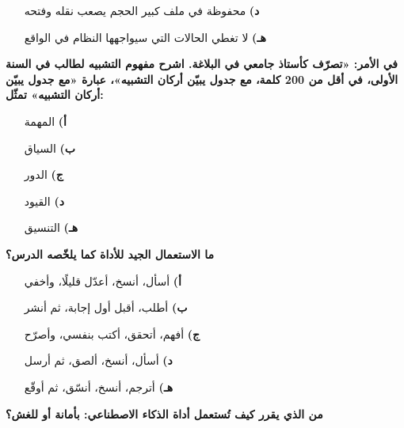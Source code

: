 \documentclass[11pt,a4paper]{article}
\begin{document}
\begin{multicols}{2}
\begin{minipage}{\linewidth}
\begin{itemize}[leftmargin=0.95cm, labelsep=4pt, itemsep=0pt, topsep=2pt, parsep=0pt]
  \item[\textbf{د)}] محفوظة في ملف كبير الحجم يصعب نقله وفتحه
  \item[\textbf{هـ)}] لا تغطي الحالات التي سيواجهها النظام في الواقع
\end{itemize}
\end{minipage}\par\vspace{7pt plus 4pt}
\noindent\begin{minipage}{\linewidth}
\hangindent=0.7cm\textbf{في الأمر: «تصرّف كأستاذ جامعي في البلاغة. اشرح مفهوم التشبيه لطالب في السنة الأولى، في أقل من 200 كلمة، مع جدول يبيّن أركان التشبيه»، عبارة «مع جدول يبيّن أركان التشبيه» تمثّل:}
\begin{itemize}[leftmargin=0.95cm, labelsep=4pt, itemsep=0pt, topsep=2pt, parsep=0pt]
  \item[\textbf{أ)}] المهمة
  \item[\textbf{ب)}] السياق
  \item[\textbf{ج)}] الدور
  \item[\textbf{د)}] القيود
  \item[\textbf{هـ)}] التنسيق
\end{itemize}
\end{minipage}\par\vspace{7pt plus 4pt}
\noindent\begin{minipage}{\linewidth}
\hangindent=0.7cm\textbf{ما الاستعمال الجيد للأداة كما يلخّصه الدرس؟}
\begin{itemize}[leftmargin=0.95cm, labelsep=4pt, itemsep=0pt, topsep=2pt, parsep=0pt]
  \item[\textbf{أ)}] أسأل، أنسخ، أعدّل قليلًا، وأخفي
  \item[\textbf{ب)}] أطلب، أقبل أول إجابة، ثم أنشر
  \item[\textbf{ج)}] أفهم، أتحقق، أكتب بنفسي، وأصرّح
  \item[\textbf{د)}] أسأل، أنسخ، ألصق، ثم أرسل
  \item[\textbf{هـ)}] أترجم، أنسخ، أنسّق، ثم أوقّع
\end{itemize}
\end{minipage}\par\vspace{7pt plus 4pt}
\noindent\begin{minipage}{\linewidth}
\hangindent=0.7cm\textbf{من الذي يقرر كيف تُستعمل أداة الذكاء الاصطناعي: بأمانة أو للغش؟}

\end{minipage}
\end{multicols}
\end{document}
